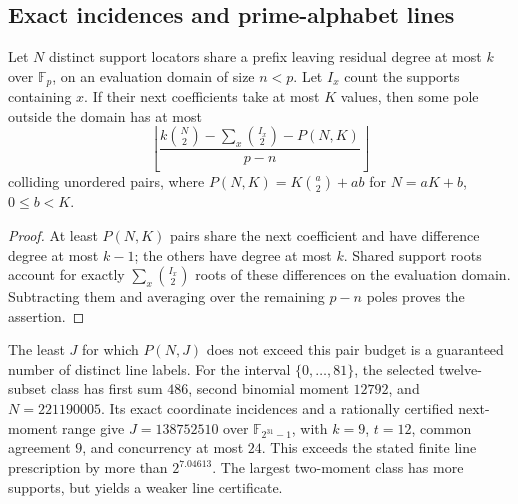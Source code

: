 \subsection{Exact incidences and prime-alphabet lines}
\label{sec:overnight-prime-lines}
\begin{proposition}
Let $N$ distinct support locators share a prefix leaving residual degree
at most $k$ over $\mathbb F_p$, on an evaluation domain of size $n<p$.
Let $I_x$ count the supports containing $x$. If their next coefficients
take at most $K$ values, then some pole outside the domain has at most
\[
 \left\lfloor\frac{
 k\binom N2-\sum_x\binom{I_x}{2}-P(N,K)}{p-n}\right\rfloor
\]
colliding unordered pairs, where
$P(N,K)=K\binom a2+ab$ for $N=aK+b$, $0\le b<K$.
\end{proposition}

\begin{proof}
At least $P(N,K)$ pairs share the next coefficient and have difference
degree at most $k-1$; the others have degree at most $k$.
Shared support roots account for exactly $\sum_x\binom{I_x}{2}$ roots
of these differences on the evaluation domain. Subtracting them and
averaging over the remaining $p-n$ poles proves the assertion.
\end{proof}

The least $J$ for which $P(N,J)$ does not exceed this pair budget is a
guaranteed number of distinct line labels. For the interval $\{0,\ldots,81\}$,
the selected twelve-subset class has first sum $486$, second binomial
moment $12792$, and $N=221190005$. Its exact coordinate incidences and
a rationally certified next-moment range give $J=138752510$ over
$\mathbb F_{2^{31}-1}$, with $k=9$, $t=12$, common agreement $9$,
and concurrency at most $24$. This exceeds the stated finite line
prescription by more than $2^{7.04613}$. The largest two-moment class
has more supports, but yields a weaker line certificate.

